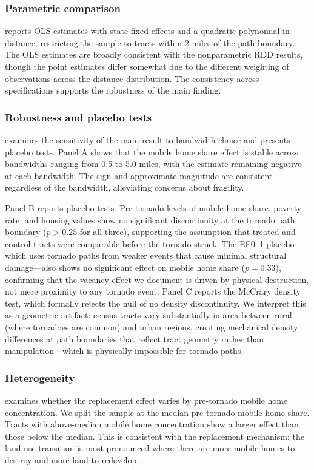 \documentclass[12pt]{article}
\begin{document}


\subsubsection*{Parametric comparison}  reports OLS estimates with state fixed effects and a quadratic polynomial in distance, restricting the sample to tracts within 2 miles of the path boundary. The OLS estimates are broadly consistent with the nonparametric RDD results, though the point estimates differ somewhat due to the different weighting of observations across the distance distribution. The consistency across specifications supports the robustness of the main finding.



\subsubsection*{Robustness and placebo tests}  examines the sensitivity of the main result to bandwidth choice and presents placebo tests. Panel A shows that the mobile home share effect is stable across bandwidths ranging from 0.5 to 5.0 miles, with the estimate remaining negative at each bandwidth. The sign and approximate magnitude are consistent regardless of the bandwidth, alleviating concerns about fragility.

Panel B reports placebo tests. Pre-tornado levels of mobile home share, poverty rate, and housing values show no significant discontinuity at the tornado path boundary ($p > 0.25$ for all three), supporting the assumption that treated and control tracts were comparable before the tornado struck. The EF0--1 placebo---which uses tornado paths from weaker events that cause minimal structural damage---also shows no significant effect on mobile home share ($p = 0.33$), confirming that the vacancy effect we document is driven by physical destruction, not mere proximity to any tornado event. Panel C reports the McCrary density test, which formally rejects the null of no density discontinuity. We interpret this as a geometric artifact: census tracts vary substantially in area between rural (where tornadoes are common) and urban regions, creating mechanical density differences at path boundaries that reflect tract geometry rather than manipulation---which is physically impossible for tornado paths.



\subsubsection*{Heterogeneity}  examines whether the replacement effect varies by pre-tornado mobile home concentration. We split the sample at the median pre-tornado mobile home share. Tracts with above-median mobile home concentration show a larger effect than those below the median. This is consistent with the replacement mechanism: the land-use transition is most pronounced where there are more mobile homes to destroy and more land to redevelop.
\end{document}
